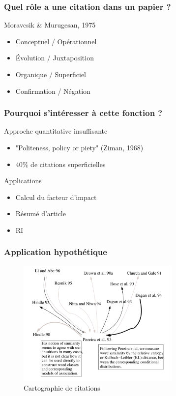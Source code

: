 \documentclass[10pt]{beamer}
\begin{document}
\begin{frame}
  \frametitle{Quel rôle a une citation dans un papier ?}

  \begin{block}{Moravcsik \& Murugesan, 1975}
	  \begin{itemize}
		\item Conceptuel / Opérationnel
		\item Évolution / Juxtaposition
		\item Organique / Superficiel
		\item Confirmation / Négation
	  \end{itemize}
  \end{block}
\end{frame}

\begin{frame}
  \frametitle{Pourquoi s'intéresser à cette fonction ?}
  
  \begin{block}{Approche quantitative insuffisante}
	  \begin{itemize}
		\item "Politeness, policy or piety" (Ziman, 1968)
		\item 40\% de citations superficielles
	  \end{itemize}
  \end{block}
  
  \begin{block}{Applications}
	  \begin{itemize}
		\item Calcul du facteur d'impact
		\item Résumé d'article
		\item RI
	  \end{itemize}
  \end{block}
\end{frame}

\begin{frame}
  \frametitle{Application hypothétique}
\begin{figure}[ht!]
\centering
\includegraphics[width=80mm]{citation_map.png}
\caption{Cartographie de citations}
\label{overflow}
\end{figure}

\end{frame}
\end{document}
